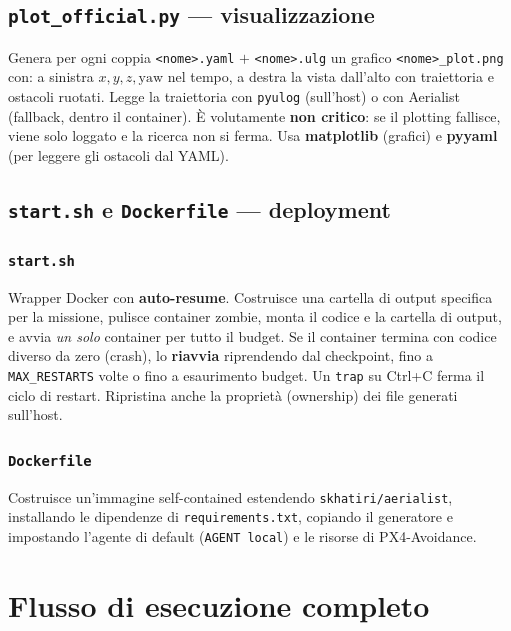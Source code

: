 \documentclass[11pt,a4paper]{report}
\newcommand{\code}[1]{\texttt{#1}}
\begin{document}
\section{\texttt{plot\_official.py} --- visualizzazione}
\label{sec:plot}
Genera per ogni coppia \code{<nome>.yaml} $+$ \code{<nome>.ulg} un grafico
\code{<nome>\_plot.png} con: a sinistra $x,y,z,\text{yaw}$ nel tempo, a
destra la vista dall'alto con traiettoria e ostacoli ruotati. Legge la
traiettoria con \code{pyulog} (sull'host) o con Aerialist (fallback,
dentro il container). È volutamente \textbf{non critico}: se il plotting
fallisce, viene solo loggato e la ricerca non si ferma. Usa
\textbf{matplotlib} (grafici) e \textbf{pyyaml} (per leggere gli
ostacoli dal YAML).

\section{\texttt{start.sh} e \texttt{Dockerfile} --- deployment}
\label{sec:deploy}

\subsection{\texttt{start.sh}}
Wrapper Docker con \textbf{auto-resume}. Costruisce una cartella di
output specifica per la missione, pulisce container zombie, monta il
codice e la cartella di output, e avvia \emph{un solo} container per
tutto il budget. Se il container termina con codice diverso da zero
(crash), lo \textbf{riavvia} riprendendo dal checkpoint, fino a
\code{MAX\_RESTARTS} volte o fino a esaurimento budget. Un \code{trap} su
Ctrl+C ferma il ciclo di restart. Ripristina anche la proprietà
(ownership) dei file generati sull'host.

\subsection{\texttt{Dockerfile}}
Costruisce un'immagine self-contained estendendo
\code{skhatiri/aerialist}, installando le dipendenze di
\code{requirements.txt}, copiando il generatore e impostando l'agente di
default (\code{AGENT local}) e le risorse di PX4-Avoidance.

\chapter{Flusso di esecuzione completo}
\end{document}
